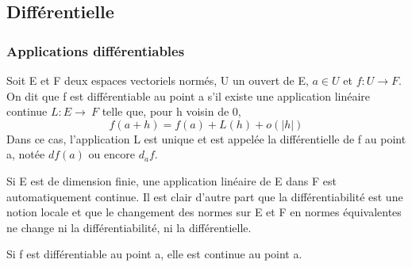 \subsection{Différentielle}
%
\subsubsection{Applications différentiables}
%
\begin{de}
  Soit E et F deux espaces vectoriels normés, U un
  ouvert de E, $a \in U$ et $f : U \rightarrow F$. On dit que f est différentiable au
  point a s'il existe une application linéaire continue $L : E \rightarrow~ F$ telle
  que, pour h voisin de 0,
  \[
    f(a + h) = f(a) + L(h) +
    o(|h|)
  \]
  Dans ce cas, l'application L est unique et est appelée la différentielle
  de f au point a, notée $df(a)$ ou encore $d_a f$.
\end{de}
%
%
%
%
%
\begin{example}[Remarque]
  Si E est de dimension finie, une application linéaire de
  E dans F est automatiquement continue. Il est clair d'autre part que la
  différentiabilité est une notion locale et que le changement des normes
  sur E et F en normes équivalentes ne change ni la différentiabilité, ni
  la différentielle.

\end{example}
%
\begin{cor}
  Si f est différentiable au point a, elle est continue
  au point a.
%
\end{cor}
%
